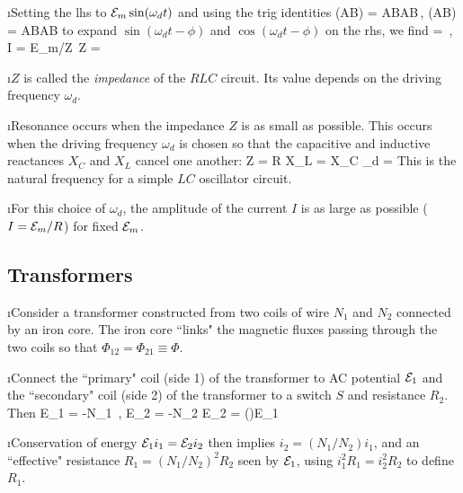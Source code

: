 \i Setting the lhs to ${\cal E}_m \sin(\omega_d t)$ and using the 
trig identities
%
\be
\sin(A\pm B) = \sin A\cos B\pm \cos A\sin B\,,\qquad
\cos(A\pm B) = \cos A\cos B\mp \sin A\sin B
\ee
%
to expand $\sin(\omega_d t-\phi)$ and $\cos(\omega_d t-\phi)$ on the rhs, 
we find
%
\be
\tan\phi = \,,
\quad
I = {\cal E}_m/{Z}\,
\quad
Z = 
\ee
%

\i $Z$ is called the {\it impedance} of the $RLC$ circuit. 
Its value depends on the driving frequency $\omega_d$.

\i Resonance occurs when the impedance $Z$ is as small as possible.
This occurs when the driving frequency $\omega_d$ is chosen so that
the capacitive and inductive reactances $X_C$ and $X_L$ cancel one another:
\be
Z = R
\quad\iff\quad
X_L = X_C
\quad\iff\quad
\omega_d = 
\ee
%
This is the natural frequency for a simple $LC$ oscillator circuit.

\i For this choice of $\omega_d$, the amplitude of the current $I$ 
is as large as possible ($I = {\cal E}_m/R$) for fixed ${\cal E}_m$.

\ei
\subsection{Transformers}

\bi

\i Consider a transformer constructed from two coils of wire
$N_1$ and $N_2$ connected by an iron core.
The iron core ``links" the magnetic fluxes passing through 
the two coils so that $\Phi_{12}=\Phi_{21}\equiv \Phi$.

\i Connect the ``primary" coil (side 1) of the transformer to 
AC potential ${\cal E}_1$ and the ``secondary" coil (side 2) of 
the transformer to a switch $S$ and resistance $R_2$.
Then
%
\be
{\cal E}_1 = -N_1 \,,
\quad
{\cal E}_2 = -N_2 
\quad\implies\quad
{\cal E}_2 = \left(\right){\cal E}_1
\ee

\i Conservation of energy 
${\cal E}_1 i_1= {\cal E}_2 i_2$ then implies
$i_2 = (N_1/N_2) i_1$, and an ``effective" resistance
$R_1 = (N_1/N_2)^2 R_2$ seen by ${\cal E}_1$,
using $i_1^2 R_1 = i_2^2 R_2$ to define $R_1$.

\ei


